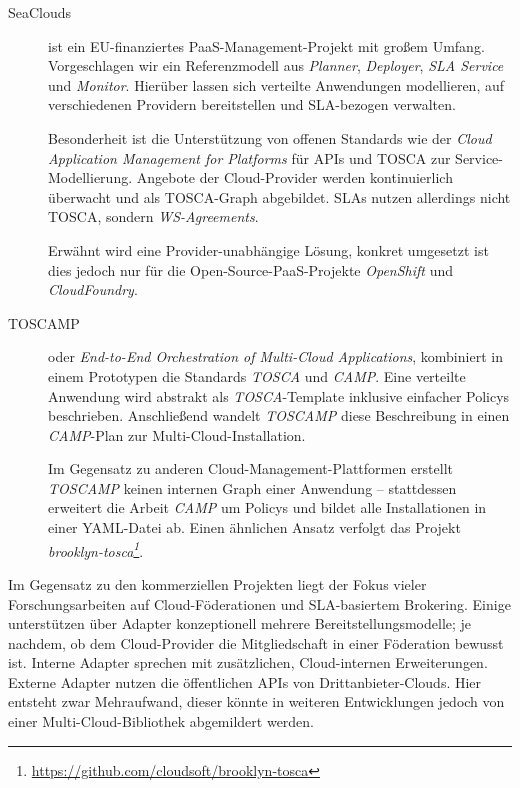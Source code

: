 \begin{description}
	
	\item[SeaClouds] ist ein EU-finanziertes PaaS-Management-Projekt mit großem Umfang. Vorgeschlagen wir ein Referenzmodell aus \emph{Planner}, \emph{Deployer}, \emph{SLA Service} und \emph{Monitor}. Hierüber lassen sich verteilte Anwendungen modellieren, auf verschiedenen Providern bereitstellen und SLA-bezogen verwalten.
	
	Besonderheit ist die Unterstützung von offenen Standards wie der \emph{Cloud Application Management for Platforms} für APIs und TOSCA zur Service-Modellierung. Angebote der Cloud-Provider werden kontinuierlich überwacht und als TOSCA-Graph abgebildet. SLAs nutzen allerdings nicht TOSCA, sondern \emph{WS-Agreements}.
		
	Erwähnt wird eine Provider-unabhängige Lösung, konkret umgesetzt ist dies jedoch nur für die Open-Source-PaaS-Projekte \emph{OpenShift} und \emph{CloudFoundry}.
	
	\item[TOSCAMP] oder \emph{End-to-End Orchestration of
	Multi-Cloud Applications}, kombiniert in einem Prototypen die Standards \emph{TOSCA} und \emph{CAMP}. Eine verteilte Anwendung wird abstrakt als \emph{TOSCA}-Template inklusive einfacher Policys beschrieben. Anschließend wandelt \emph{TOSCAMP} diese Beschreibung in einen \emph{CAMP}-Plan zur Multi-Cloud-Installation.

	Im Gegensatz zu anderen Cloud-Management-Plattformen erstellt \emph{TOSCAMP} keinen internen Graph einer Anwendung -- stattdessen erweitert die Arbeit \emph{CAMP} um Policys und bildet alle Installationen in einer YAML-Datei ab. Einen ähnlichen Ansatz verfolgt das Projekt \emph{brooklyn-tosca\footnote{\url{https://github.com/cloudsoft/brooklyn-tosca}}}.
	
%	
%	
%	
	
\end{description}



\noindent
Im Gegensatz zu den kommerziellen Projekten liegt der Fokus vieler Forschungsarbeiten auf Cloud-Föderationen und SLA-basiertem Brokering. Einige unterstützen über Adapter konzeptionell mehrere Bereitstellungsmodelle; je nachdem, ob dem Cloud-Provider die Mitgliedschaft in einer Föderation bewusst ist. Interne Adapter sprechen mit zusätzlichen, Cloud-internen Erweiterungen. Externe Adapter nutzen die öffentlichen APIs von Drittanbieter-Clouds. Hier entsteht zwar Mehraufwand, dieser könnte in weiteren Entwicklungen jedoch von einer Multi-Cloud-Bibliothek abgemildert werden.

